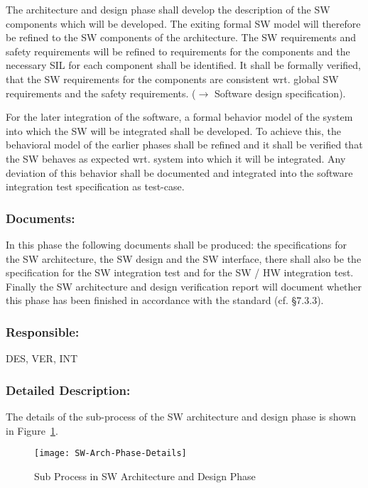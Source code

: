 The architecture and design phase shall develop the description of the SW
components which will be developed. The exiting formal SW model will therefore
be refined to the SW components of the architecture. The SW requirements and
safety requirements will be refined to requirements for the components and the
necessary SIL for each component shall be identified. It shall be formally
verified, that the SW requirements for the components are consistent wrt. global
SW requirements and the safety requirements. ($\rightarrow$ Software design
specification).

For the later integration of the software, a formal behavior model of the system
into which the SW will be integrated shall be developed. To achieve this, the
behavioral model of the earlier phases shall be refined and it shall be verified
that the SW behaves as expected wrt. system into which it will be
integrated. Any deviation of this behavior shall be documented and integrated
into the software integration test specification as test-case.

\subsubsection{Documents:}
\label{sec:sw-arch-documents}
In this phase the following documents shall be produced: the
specifications for the SW architecture, the SW design and the SW interface,
there shall also be the specification for the SW integration test and for the SW
/ HW integration test. Finally the SW architecture and design verification
report will document whether this phase has been finished in accordance with
the standard (cf. §7.3.3).

\subsubsection{Responsible:}
\label{sec:sw-arch-responsible}
DES, VER, INT

\subsubsection{Detailed Description:}
\label{sec:sw-arch-deta-descr}
The details of the sub-process of the SW architecture and design phase is shown
in Figure~\ref{fig:detailed-sw-arch-phase}.

\begin{figure}[ht]
  \centering
  \texttt{[image: SW-Arch-Phase-Details]}
  \caption{Sub Process in SW Architecture and Design Phase}
  \label{fig:detailed-sw-arch-phase}
\end{figure}

